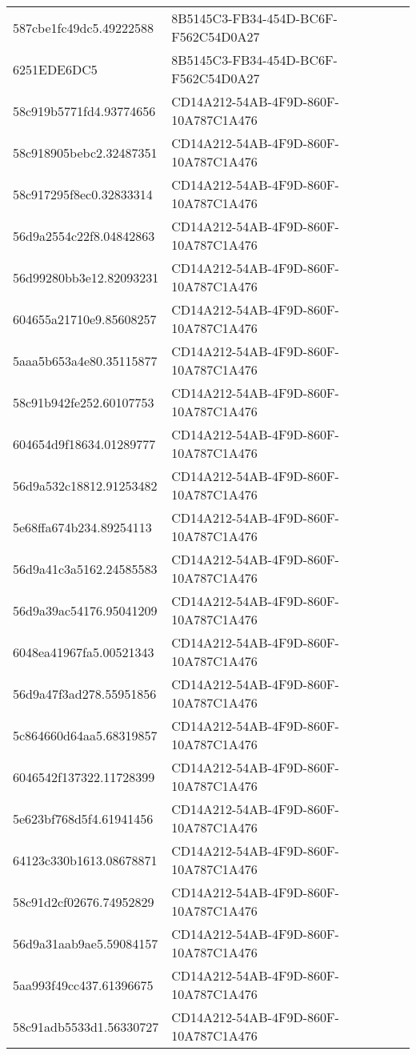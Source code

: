 \begin{tabular}{ll}
587cbe1fc49dc5.49222588 & 8B5145C3-FB34-454D-BC6F-F562C54D0A27 \\
6251EDE6DC5 & 8B5145C3-FB34-454D-BC6F-F562C54D0A27 \\
58c919b5771fd4.93774656 & CD14A212-54AB-4F9D-860F-10A787C1A476 \\
58c918905bebc2.32487351 & CD14A212-54AB-4F9D-860F-10A787C1A476 \\
58c917295f8ec0.32833314 & CD14A212-54AB-4F9D-860F-10A787C1A476 \\
56d9a2554c22f8.04842863 & CD14A212-54AB-4F9D-860F-10A787C1A476 \\
56d99280bb3e12.82093231 & CD14A212-54AB-4F9D-860F-10A787C1A476 \\
604655a21710e9.85608257 & CD14A212-54AB-4F9D-860F-10A787C1A476 \\
5aaa5b653a4e80.35115877 & CD14A212-54AB-4F9D-860F-10A787C1A476 \\
58c91b942fe252.60107753 & CD14A212-54AB-4F9D-860F-10A787C1A476 \\
604654d9f18634.01289777 & CD14A212-54AB-4F9D-860F-10A787C1A476 \\
56d9a532c18812.91253482 & CD14A212-54AB-4F9D-860F-10A787C1A476 \\
5e68ffa674b234.89254113 & CD14A212-54AB-4F9D-860F-10A787C1A476 \\
56d9a41c3a5162.24585583 & CD14A212-54AB-4F9D-860F-10A787C1A476 \\
56d9a39ac54176.95041209 & CD14A212-54AB-4F9D-860F-10A787C1A476 \\
6048ea41967fa5.00521343 & CD14A212-54AB-4F9D-860F-10A787C1A476 \\
56d9a47f3ad278.55951856 & CD14A212-54AB-4F9D-860F-10A787C1A476 \\
5c864660d64aa5.68319857 & CD14A212-54AB-4F9D-860F-10A787C1A476 \\
6046542f137322.11728399 & CD14A212-54AB-4F9D-860F-10A787C1A476 \\
5e623bf768d5f4.61941456 & CD14A212-54AB-4F9D-860F-10A787C1A476 \\
64123c330b1613.08678871 & CD14A212-54AB-4F9D-860F-10A787C1A476 \\
58c91d2cf02676.74952829 & CD14A212-54AB-4F9D-860F-10A787C1A476 \\
56d9a31aab9ae5.59084157 & CD14A212-54AB-4F9D-860F-10A787C1A476 \\
5aa993f49cc437.61396675 & CD14A212-54AB-4F9D-860F-10A787C1A476 \\
58c91adb5533d1.56330727 & CD14A212-54AB-4F9D-860F-10A787C1A476 \\

\end{tabular}
